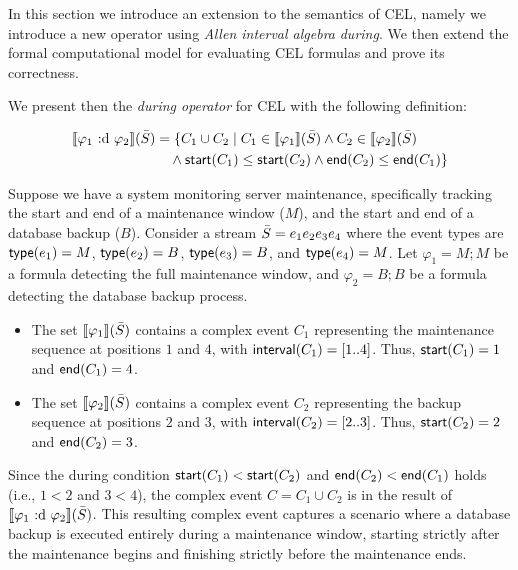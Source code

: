 In this section we introduce an extension to the semantics of CEL, namely we introduce a new operator using \textit{Allen interval algebra} \textit{during}.
We then extend the formal computational model for evaluating CEL formulas and prove its correctness.

We present then the \emph{during operator} for CEL with the following definition:


$$\begin{aligned} 	\sem{\varphi_1 \during \varphi_2}(\Stream) 	&= \{C_1 \cup C_2 \mid C_1 \in \sem{\varphi_1}(\Stream)  	\land C_2 \in \sem{\varphi_2}(\Stream) \\ 	&\quad \land \cstart(C_1) \leq \cstart(C_2) \land \cend(C_2) \leq \cend(C_1)\} \end{aligned}$$

\begin{example} Suppose we have a system monitoring server maintenance, specifically tracking the start and end of a maintenance window ($M$), and the start and end of a database backup ($B$). Consider a stream $\bar{S} = e_1 e_2 e_3 e_4$ where the event types are $\mathsf{type}(e_1) = M$, $\mathsf{type}(e_2) = B$, $\mathsf{type}(e_3) = B$, and $\mathsf{type}(e_4) = M$.
Let $\varphi_1 = M ; M$ be a formula detecting the full maintenance window, and $\varphi_2 = B ; B$ be a formula detecting the database backup process.
\begin{itemize}
	\item The set $\sem{\varphi_1}(\Stream)$ contains a complex event $C_1$ representing the maintenance sequence at positions $1$ and $4$, with $\mathsf{interval}(C_1) = [1..4]$. Thus, $\mathsf{start}(C_1) = 1$ and $\mathsf{end}(C_1) = 4$.
	\item The set $\sem{\varphi_2}(\Stream)$ contains a complex event $C_2$ representing the backup sequence at positions $2$ and $3$, with $\mathsf{interval}(C_2) = [2..3]$. Thus, $\mathsf{start}(C_2) = 2$ and $\mathsf{end}(C_2) = 3$.
\end{itemize}

Since the during condition $\mathsf{start}(C_1) < \mathsf{start}(C_2)$ and $\mathsf{end}(C_2) < \mathsf{end}(C_1)$ holds (i.e., $1 < 2$ and $3 < 4$), the complex event $C = C_1 \cup C_2$ is in the result of $\sem{\varphi_1 \during \varphi_2}(\Stream)$. This resulting complex event captures a scenario where a database backup is executed entirely during a maintenance window, starting strictly after the maintenance begins and finishing strictly before the maintenance ends.

\end{example}

